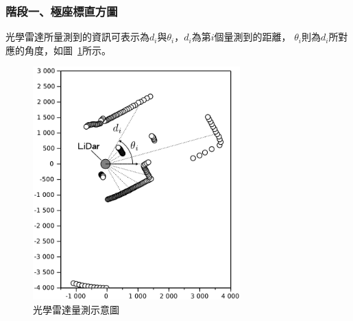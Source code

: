 \subsubsection{階段一、極座標直方圖}
光學雷達所量測到的資訊可表示為$d_i$與$\theta_i$，$d_i$為第$i$個量測到的距離，
$\theta_i$則為$d_i$所對應的角度，如圖~\ref{f:LiDar_measurement}所示。
\begin{figure}[h!]
	\centering
	\includegraphics[width=8cm]{figures/LiDar_measurement}
	\caption{光學雷達量測示意圖}
	\label{f:LiDar_measurement}
\end{figure}


